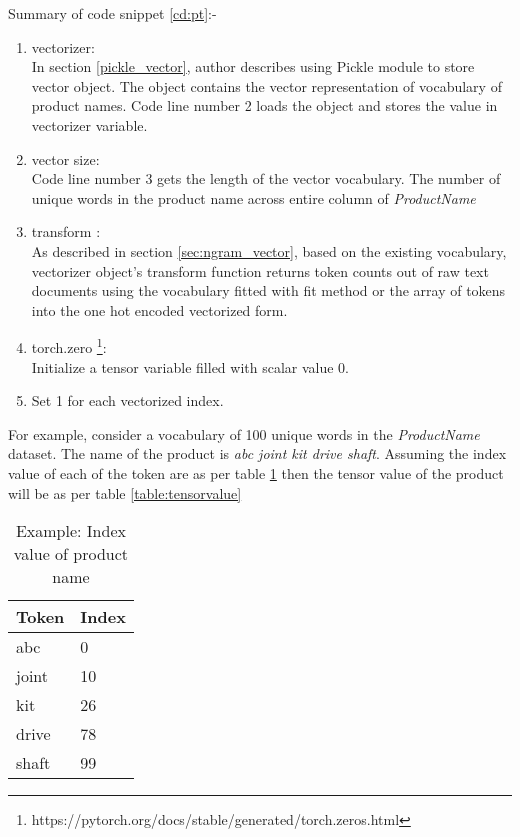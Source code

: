 Summary of code snippet \ref{cd:pt}:-

\begin{enumerate}
    \item vectorizer: \\
    In section \ref{pickle_vector}, author describes using Pickle module to store vector object. The object contains the vector representation of vocabulary of product names. Code line number 2 loads the object and stores the value in vectorizer variable.
    \item vector size: \\
    Code line number 3 gets the length of the vector vocabulary. The number of unique words in the product name across entire column of \textit{ProductName}
    \item transform : \\
    As described in section \ref{sec:ngram_vector}, based on the existing vocabulary, vectorizer object's transform function returns token counts out of raw text documents using the vocabulary fitted with fit method or the array of tokens into the one hot encoded vectorized form. 
    \item torch.zero \footnote{https://pytorch.org/docs/stable/generated/torch.zeros.html}: \\
    Initialize a tensor variable filled with scalar value 0.

    \item Set 1 for each vectorized index.
    
\end{enumerate}

For example, consider a vocabulary of 100 unique words in the \textit{ProductName} dataset. The name of the product is \textit{abc joint kit drive shaft}. Assuming the index value of each of the token are as per table \ref{table:names index} then the tensor value of the product will be as per table \ref{table:tensorvalue} 

\begin{table}[htp!]
    \centering
    \caption{Example: Index value of product name}
    \label{table:names index}
    \begin{tabular}{ ll }
          \toprule
          
          \textbf{Token} & \textbf{Index}\\
          \midrule
          abc&0\\
          joint&10\\
          kit&26\\
          drive&78\\
          shaft&99\\
                 
        
          \bottomrule
          \end{tabular}
\end{table}

